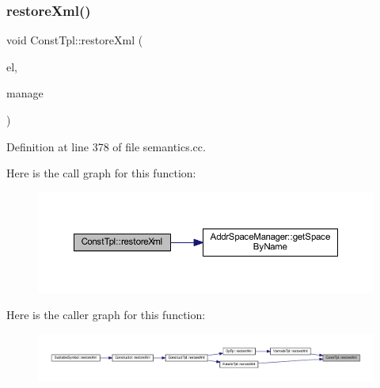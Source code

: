 \mbox{\label{class_const_tpl_a693d02a50ed80c1601bb7d6e648c09ec}} 
\subsubsection{\texorpdfstring{restoreXml()}{restoreXml()}}
{\footnotesize\ttfamily void Const\+Tpl\+::restore\+Xml (\begin{DoxyParamCaption}\item[{const \mbox{\hyperlink{class_element}{Element}} $\ast$}]{el,  }\item[{const \mbox{\hyperlink{class_addr_space_manager}{Addr\+Space\+Manager}} $\ast$}]{manage }\end{DoxyParamCaption})}



Definition at line 378 of file semantics.\+cc.

Here is the call graph for this function\+:
\nopagebreak
\begin{figure}[H]
\begin{center}
\leavevmode
\includegraphics[width=350pt]{class_const_tpl_a693d02a50ed80c1601bb7d6e648c09ec_cgraph}
\end{center}
\end{figure}
Here is the caller graph for this function\+:
\nopagebreak
\begin{figure}[H]
\begin{center}
\leavevmode
\includegraphics[width=350pt]{class_const_tpl_a693d02a50ed80c1601bb7d6e648c09ec_icgraph}
\end{center}
\end{figure}
\mbox{\label{class_const_tpl_ad8fe31f044a44888cbf07b760db54627}} 
